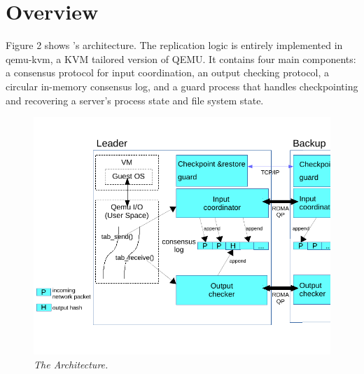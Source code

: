 \section{\xxx Overview} \label{sec:overview}

Figure 2 shows \xxx's architecture. The replication logic is entirely 
implemented in qemu-kvm, a KVM tailored version of QEMU. It contains 
four main components: a \paxos consensus protocol for input coordination, 
an output checking protocol, a circular in-memory consensus log, and a 
guard process that handles checkpointing and recovering a server's process 
state and file system state.


\begin{figure}[t]
\centering
\includegraphics[width=.47\textwidth]{figures/arch}
\vspace{-.2in}
\caption{{\em The \xxx Architecture.}} \label{fig:arc}
\vspace{.05in}
\end{figure}
